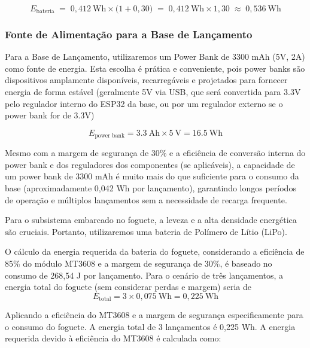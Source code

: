 \begin{equation}
E_{\text{bateria}}
\;=\;
0,412~\mathrm{Wh}
\times
\bigl(1 + 0{,}30\bigr)
\;=\;
0,412~\mathrm{Wh}
\times
1{,}30
\;\approx\;
0,536~\mathrm{Wh}
\end{equation}

\subsubsection{Fonte de Alimentação para a Base de Lançamento}


Para a Base de Lançamento, utilizaremos um Power Bank de 3300 mAh (5V, 2A) como fonte de energia. Esta escolha é prática e conveniente, pois power banks são dispositivos amplamente disponíveis, recarregáveis e projetados para fornecer energia de forma estável (geralmente 5V via USB, que será convertida para 3.3V pelo regulador interno do ESP32 da base, ou por um regulador externo se o power bank for de 3.3V) 

\begin{equation}
E_{\text{power bank}}
= 3.3~\mathrm{Ah} \times 5~\mathrm{V}
= 16.5~\mathrm{Wh}
\end{equation}

Mesmo com a margem de segurança de 30\% e a eficiência de conversão interna do power bank e dos reguladores dos componentes (se aplicáveis), a capacidade de um power bank de 3300 mAh é muito mais do que suficiente para o consumo da base (aproximadamente 0,042 Wh por lançamento), garantindo longos períodos de operação e múltiplos lançamentos sem a necessidade de recarga frequente. 


Para o subsistema embarcado no foguete, a leveza e a alta densidade energética são cruciais. Portanto, utilizaremos uma bateria de Polímero de Lítio (LiPo). 

O cálculo da energia requerida da bateria do foguete, considerando a eficiência de 85\% do módulo MT3608 e a margem de segurança de 30\%, é baseado no consumo de 268,54 J por lançamento. Para o cenário de três lançamentos, a energia total do foguete (sem considerar perdas e margem) seria de
\begin{equation}
E_{\text{total}} = 3 \times 0{,}075~\mathrm{Wh} = 0{,}225~\mathrm{Wh}
\end{equation}

Aplicando a eficiência do MT3608 e a margem de segurança especificamente para o consumo do foguete. A energia total de 3 lançamentos é 0,225 Wh. A energia requerida devido à eficiência do MT3608 é calculada como:

